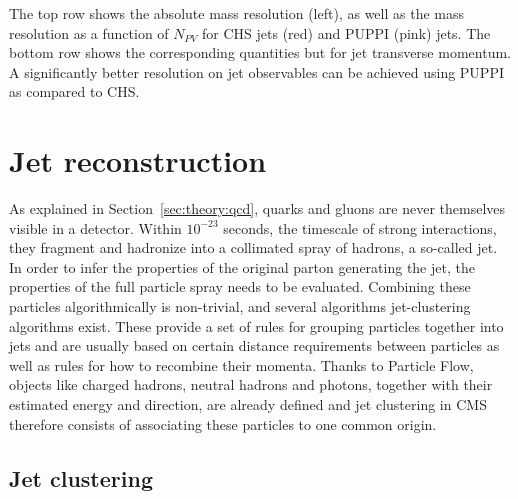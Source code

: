 The top row shows the absolute mass resolution (left), as well as the mass resolution as a function of $N_{PV}$ for CHS jets (red) and PUPPI (pink) jets. The bottom row shows the corresponding quantities but for jet transverse momentum. A significantly better resolution on jet observables can be achieved using PUPPI as compared to CHS.

\section{Jet reconstruction}
\label{sec:objreco:jets}
As explained in Section~\ref{sec:theory:qcd}, quarks and gluons are never themselves visible in a detector. Within $10^{-23}$ seconds, the timescale of strong interactions, they fragment and hadronize into a collimated spray of hadrons, a so-called jet. In order to infer the properties of the original parton generating the jet, the properties of the full particle spray needs to be evaluated.
Combining these particles algorithmically is non-trivial, and several algorithms jet-clustering algorithms exist.
These provide a set of rules for grouping particles together into jets and are usually based on certain distance requirements between particles as well as rules for how to recombine their momenta.
Thanks to Particle Flow, objects like charged hadrons, neutral hadrons and photons, together with their estimated energy and direction, are already defined and jet clustering in CMS therefore consists of associating these particles to one common origin.


\subsection{Jet clustering}

